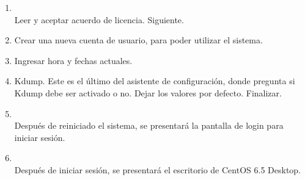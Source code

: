 \documentclass[11pt]{article}
\begin{document}
\begin{enumerate}
		    \item 
		    	\begin{minipage}[t]{\linewidth}
			        \raggedright
			        \medskip
			        \\Leer y aceptar acuerdo de licencia. Siguiente. 
		        \end{minipage}

		    \item Crear una nueva cuenta de usuario, para poder utilizar el sistema.
		    \item Ingresar hora y fechas actuales.
		    \item Kdump. Este es el último del asistente de configuración, donde pregunta si Kdump debe ser activado o no. Dejar los valores por defecto. Finalizar.

		    \item
		    	\begin{minipage}[t]{\linewidth}
			        \raggedright
			        \medskip
			        \\Después de reiniciado el sistema, se presentará la pantalla de login para iniciar sesión. 
		        \end{minipage}

	        \item
	        	\begin{minipage}[t]{\linewidth}
			        \raggedright
			        \medskip
			        \\Después de iniciar sesión, se presentará el escritorio de CentOS 6.5 Desktop.
		        \end{minipage}


\end{enumerate}
\end{document}
